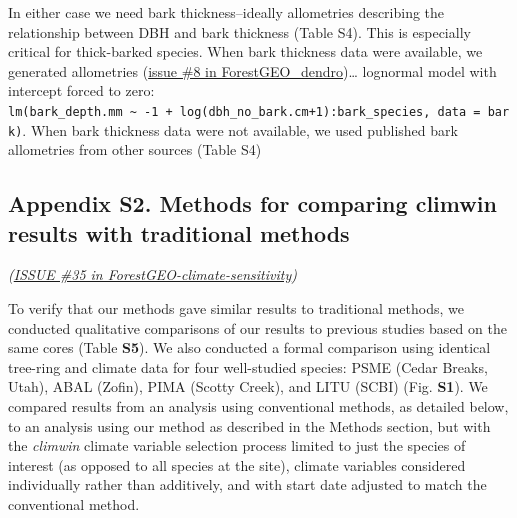 \documentclass[
]{article}
\begin{document}
In either case we need bark thickness--ideally allometries describing
the relationship between DBH and bark thickness (Table S4). This is
especially critical for thick-barked species. When bark thickness data
were available, we generated allometries
(\href{https://github.com/EcoClimLab/ForestGEO_dendro/issues/8}{issue
\#8 in ForestGEO\_dendro})\ldots{} lognormal model with intercept forced
to zero:
\texttt{lm(bark\_depth.mm\ \textasciitilde{}\ -1\ +\ log(dbh\_no\_bark.cm+1):bark\_species,\ data\ =\ bark)}.
When bark thickness data were not available, we used published bark
allometries from other sources (Table S4)

\newpage

\hypertarget{appendix-s2.-methods-for-comparing-climwin-results-with-traditional-methods}{%
\subsection{Appendix S2. Methods for comparing climwin results with
traditional
methods}\label{appendix-s2.-methods-for-comparing-climwin-results-with-traditional-methods}}

\emph{(\href{https://github.com/EcoClimLab/ForestGEO-climate-sensitivity/issues/35}{ISSUE
\#35 in ForestGEO-climate-sensitivity})}

To verify that our methods gave similar results to traditional methods,
we conducted qualitative comparisons of our results to previous studies
based on the same cores (Table \textbf{S5}). We also conducted a formal
comparison using identical tree-ring and climate data for four
well-studied species: PSME (Cedar Breaks, Utah), ABAL (Zofin), PIMA
(Scotty Creek), and LITU (SCBI) (Fig. \textbf{S1}). We compared results
from an analysis using conventional methods, as detailed below, to an
analysis using our method as described in the Methods section, but with
the \emph{climwin} climate variable selection process limited to just
the species of interest (as opposed to all species at the site), climate
variables considered individually rather than additively, and with start
date adjusted to match the conventional method.
\end{document}
